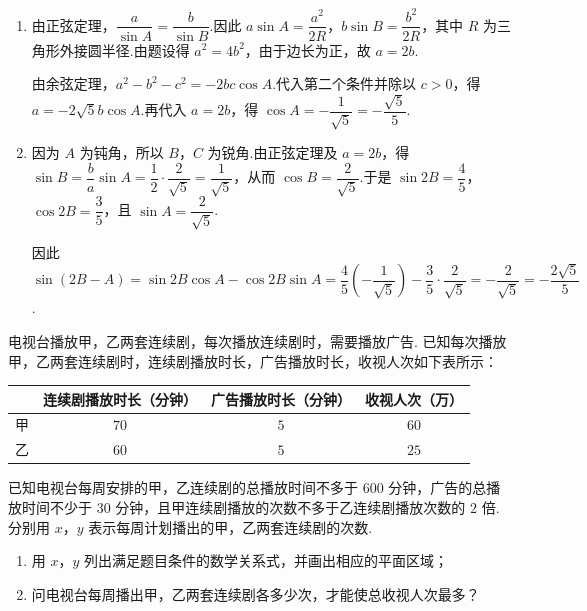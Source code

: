 \begin{solution}
\begin{enumerate}
\item 由正弦定理，\(\dfrac{a}{\sin A}=\dfrac{b}{\sin B}\).因此 \(a\sin A=\dfrac{a^2}{2R}\)，\(b\sin B=\dfrac{b^2}{2R}\)，其中 \(R\) 为三角形外接圆半径.由题设得 \(a^2=4b^2\)，由于边长为正，故 \(a=2b\).

由余弦定理，\(a^2-b^2-c^2=-2bc\cos A\).代入第二个条件并除以 \(c>0\)，得 \(a=-2\sqrt5 b\cos A\).再代入 \(a=2b\)，得 \(\cos A=-\dfrac1{\sqrt5}=-\dfrac{\sqrt5}{5}\).

\item 因为 \(A\) 为钝角，所以 \(B\)，\(C\) 为锐角.由正弦定理及 \(a=2b\)，得 \(\sin B=\dfrac ba\sin A=\dfrac12\cdot\dfrac2{\sqrt5}=\dfrac1{\sqrt5}\)，从而 \(\cos B=\dfrac2{\sqrt5}\).于是 \(\sin2B=\dfrac45\)，\(\cos2B=\dfrac35\)，且 \(\sin A=\dfrac2{\sqrt5}\).

因此 \(\sin(2B-A)=\sin2B\cos A-\cos2B\sin A=\dfrac45\left(-\dfrac1{\sqrt5}\right)-\dfrac35\cdot\dfrac2{\sqrt5}=-\dfrac2{\sqrt5}=-\dfrac{2\sqrt5}{5}\).
\end{enumerate}
\end{solution}

\begin{problem}
电视台播放甲，乙两套连续剧，每次播放连续剧时，需要播放广告. 已知每次播放甲，乙两套连续剧时，连续剧播放时长，广告播放时长，收视人次如下表所示：

\begin{center}
\begin{tabular}{c|ccc}
 & 连续剧播放时长（分钟） & 广告播放时长（分钟） & 收视人次（万）\\
\hline
甲 & \(70\) & \(5\) & \(60\)\\
乙 & \(60\) & \(5\) & \(25\)
\end{tabular}
\end{center}

已知电视台每周安排的甲，乙连续剧的总播放时间不多于 \(600\) 分钟，广告的总播放时间不少于 \(30\) 分钟，且甲连续剧播放的次数不多于乙连续剧播放次数的 \(2\) 倍. 分别用 \(x\)，\(y\) 表示每周计划播出的甲，乙两套连续剧的次数.

\begin{enumerate}
\item 用 \(x\)，\(y\) 列出满足题目条件的数学关系式，并画出相应的平面区域；
\item 问电视台每周播出甲，乙两套连续剧各多少次，才能使总收视人次最多？
\end{enumerate}
\end{problem}

